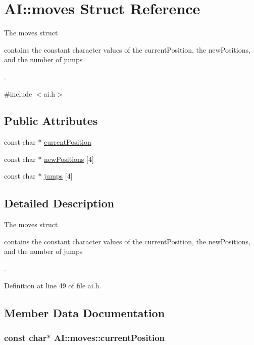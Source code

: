 \hypertarget{struct_a_i_1_1moves}{\section{A\-I\-:\-:moves Struct Reference}
\label{struct_a_i_1_1moves}
}


The moves struct \begin{DoxyVerb} contains the constant character values of the currentPosition, the newPositions, and the number of jumps\end{DoxyVerb}
.  




{\ttfamily \#include $<$ai.\-h$>$}

\subsection*{Public Attributes}
\begin{DoxyCompactItemize}
\item 
const char $\ast$ \hyperlink{struct_a_i_1_1moves_a736739fad02c378d6fd467d5eaf0926d}{current\-Position}
\item 
const char $\ast$ \hyperlink{struct_a_i_1_1moves_a1a70af16b28de0cb7d83c07b6663c647}{new\-Positions} \mbox{[}4\mbox{]}
\item 
const char $\ast$ \hyperlink{struct_a_i_1_1moves_a243ff8ab759ff66204e2d2152851fa65}{jumps} \mbox{[}4\mbox{]}
\end{DoxyCompactItemize}


\subsection{Detailed Description}
The moves struct \begin{DoxyVerb} contains the constant character values of the currentPosition, the newPositions, and the number of jumps\end{DoxyVerb}
. 

Definition at line 49 of file ai.\-h.



\subsection{Member Data Documentation}
\hypertarget{struct_a_i_1_1moves_a736739fad02c378d6fd467d5eaf0926d}{
\subsubsection[{current\-Position}]{\setlength{\rightskip}{0pt plus 5cm}const char$\ast$ A\-I\-::moves\-::current\-Position}}\label{struct_a_i_1_1moves_a736739fad02c378d6fd467d5eaf0926d}



